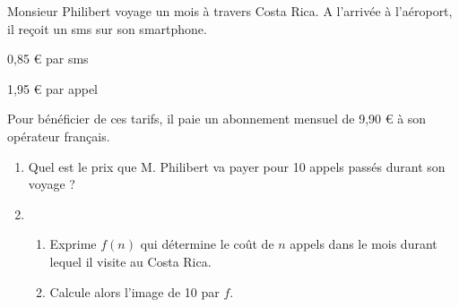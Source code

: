 
Monsieur Philibert voyage un mois à travers Costa Rica. A l'arrivée à l'aéroport, il reçoit un sms sur son smartphone. 

\begin{center}
\begin{description}
\item  0,85 \euro{} par sms
\item  1,95 \euro{} par appel
\end{description}
\end{center}

Pour bénéficier de ces tarifs, il paie un abonnement mensuel de 9,90 \euro{} à son opérateur français.

\begin{enumerate}[leftmargin=*]
\item Quel est le prix que M. Philibert va payer pour 10 appels passés durant son voyage ? 
\item 
\begin{enumerate}
\item Exprime $f(n)$ qui détermine le coût de $n$ appels dans le mois durant lequel il visite au Costa Rica. 
\item Calcule alors l'image de 10 par $f$. 
\end{enumerate}
\end{enumerate}